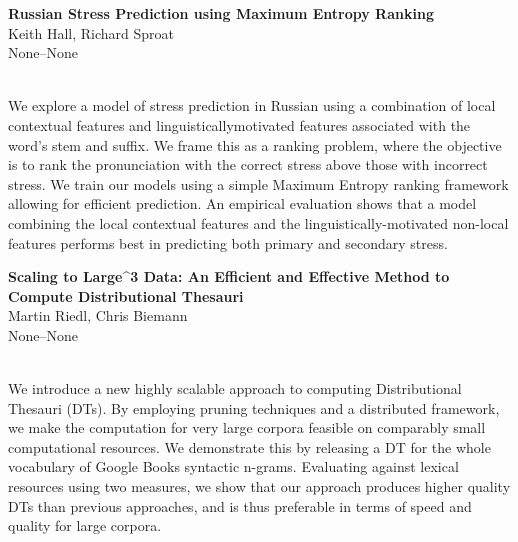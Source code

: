 \documentclass[twoside,makeidx]{book}
\renewcommand{\normalsize}{\fontsize{8}{9}\selectfont}
\renewcommand{\small}{\fontsize{7}{8}\selectfont}
\begin{document}
\par\vspace{2em}\noindent%
\begin{minipage}{\linewidth}%
\begin{center}
\textbf{\normalsize Russian Stress Prediction using Maximum Entropy Ranking}\\
\normalsize  Keith Hall,  Richard Sproat\\
{\small None--None}\\
\end{center}
\end{minipage}\\[0.5em]
\nopagebreak%
\noindent%
{\small We explore a model of stress prediction in Russian using a combination of local contextual features and linguisticallymotivated features associated with the word's stem and suffix. We frame this as a ranking problem, where the objective is to rank the pronunciation with the correct stress above those with incorrect stress. We train our models using a simple Maximum Entropy ranking framework allowing for efficient prediction. An empirical evaluation shows that a model combining the local contextual features and the linguistically-motivated non-local features performs best in predicting both primary and secondary stress.}
\par\vspace{2em}\noindent%
\begin{minipage}{\linewidth}%
\begin{center}
\textbf{\normalsize Scaling to Large\^{}3 Data: An Efficient and Effective Method to Compute Distributional Thesauri}\\
\normalsize  Martin Riedl,  Chris Biemann\\
{\small None--None}\\
\end{center}
\end{minipage}\\[0.5em]
\nopagebreak%
\noindent%
{\small We introduce a new highly scalable approach to computing Distributional Thesauri (DTs). By employing pruning techniques and a distributed framework, we make the computation for very large corpora feasible on comparably small computational resources. We demonstrate this by releasing a DT for the whole vocabulary of Google Books syntactic n-grams. Evaluating against lexical resources using two measures, we show that our approach produces higher quality DTs than previous approaches, and is thus preferable in terms of speed and quality for large corpora.}
\end{document}
